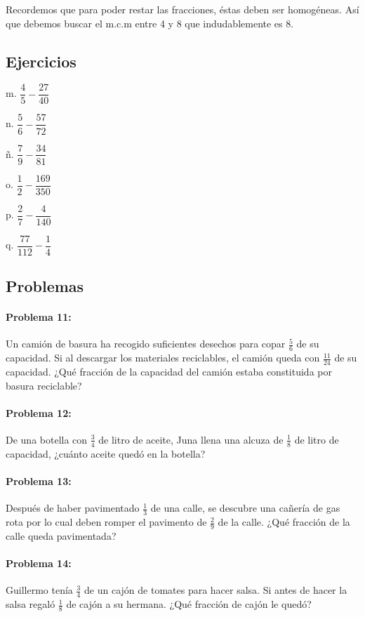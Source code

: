 \documentclass[10pt,twoside]{article}
\begin{document}
Recordemos que para poder restar las fracciones, éstas deben ser homogéneas. Así que debemos buscar el m.c.m entre 4 y 8 que indudablemente es 8.
\subsection*{Ejercicios}
\begin{enumerate}
\begin{multicols}{3}
\item[m.] $\dfrac{4}{5}-\dfrac{27}{40}$
\item[n.] $\dfrac{5}{6}-\dfrac{57}{72}$
\item[ñ.] $\dfrac{7}{9}-\dfrac{34}{81}$
\item[o.] $\dfrac{1}{2}-\dfrac{169}{350}$
\item[p.] $\dfrac{2}{7}-\dfrac{4}{140}$
\item[q.] $\dfrac{77}{112}-\dfrac{1}{4}$
\end{multicols}
\end{enumerate}
\subsection*{Problemas}
\paragraph*{Problema 11:} Un camión de basura ha recogido suficientes desechos para copar $\frac{5}{6}$ de su capacidad. Si al descargar los materiales reciclables, el camión queda con $\frac{11}{24}$ de su capacidad. ¿Qué fracción de la capacidad del camión estaba constituida por basura reciclable?
\paragraph*{Problema 12:} De una botella con $\frac{3}{4}$ de litro de aceite, Juna llena una alcuza de $\frac{1}{8}$ de litro de capacidad, ¿cuánto aceite quedó en la botella?
\paragraph*{Problema 13:} Después de haber pavimentado $\frac{1}{3}$ de una calle, se descubre una cañería de gas rota por lo cual deben romper el pavimento de $\frac{2}{9}$ de la calle. ¿Qué fracción de la calle queda pavimentada?
\paragraph*{Problema 14:} Guillermo tenía $\frac{3}{4}$ de un cajón de tomates para hacer salsa. Si antes de hacer la salsa regaló $\frac{1}{8}$ de cajón a su hermana. ¿Qué fracción de cajón le quedó?
\end{document}
